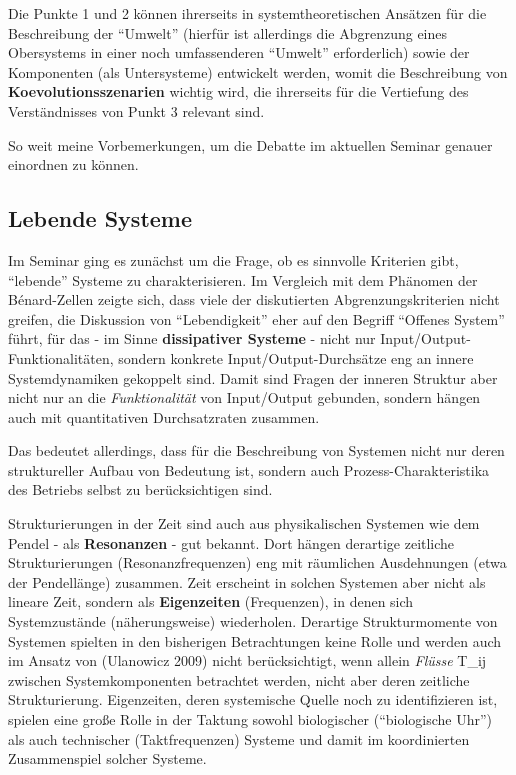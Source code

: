 \documentclass[11pt,a4paper]{article}
\begin{document}
Die Punkte 1 und 2 können ihrerseits in systemtheoretischen Ansätzen für
die Beschreibung der ``Umwelt'' (hierfür ist allerdings die Abgrenzung
eines Obersystems in einer noch umfassenderen ``Umwelt'' erforderlich)
sowie der Komponenten (als Untersysteme) entwickelt werden, womit die
Beschreibung von \textbf{Koevolutionsszenarien} wichtig wird, die
ihrerseits für die Vertiefung des Verständnisses von Punkt 3 relevant
sind.

So weit meine Vorbemerkungen, um die Debatte im aktuellen Seminar
genauer einordnen zu können.

\hypertarget{lebende-systeme}{%
\subsection{Lebende Systeme}\label{lebende-systeme}}

Im Seminar ging es zunächst um die Frage, ob es sinnvolle Kriterien
gibt, ``lebende'' Systeme zu charakterisieren. Im Vergleich mit dem
Phänomen der Bénard-Zellen zeigte sich, dass viele der diskutierten
Abgrenzungskriterien nicht greifen, die Diskussion von ``Lebendigkeit''
eher auf den Begriff ``Offenes System'' führt, für das - im Sinne
\textbf{dissipativer Systeme} - nicht nur Input/Output-Funktionalitäten,
sondern konkrete Input/Output-Durchsätze eng an innere Systemdynamiken
gekoppelt sind. Damit sind Fragen der inneren Struktur aber nicht nur an
die \emph{Funktionalität} von Input/Output gebunden, sondern hängen auch
mit quantitativen Durchsatzraten zusammen.

Das bedeutet allerdings, dass für die Beschreibung von Systemen nicht
nur deren struktureller Aufbau von Bedeutung ist, sondern auch
Prozess-Charakteristika des Betriebs selbst zu berücksichtigen sind.

Strukturierungen in der Zeit sind auch aus physikalischen Systemen wie
dem Pendel - als \textbf{Resonanzen} - gut bekannt. Dort hängen
derartige zeitliche Strukturierungen (Resonanzfrequenzen) eng mit
räumlichen Ausdehnungen (etwa der Pendellänge) zusammen. Zeit erscheint
in solchen Systemen aber nicht als lineare Zeit, sondern als
\textbf{Eigenzeiten} (Frequenzen), in denen sich Systemzustände
(näherungsweise) wiederholen. Derartige Strukturmomente von Systemen
spielten in den bisherigen Betrachtungen keine Rolle und werden auch im
Ansatz von (Ulanowicz 2009) nicht berücksichtigt, wenn allein
\emph{Flüsse} T\_ij zwischen Systemkomponenten betrachtet werden, nicht
aber deren zeitliche Strukturierung. Eigenzeiten, deren systemische
Quelle noch zu identifizieren ist, spielen eine große Rolle in der
Taktung sowohl biologischer (``biologische Uhr'') als auch technischer
(Taktfrequenzen) Systeme und damit im koordinierten Zusammenspiel
solcher Systeme.
\end{document}
